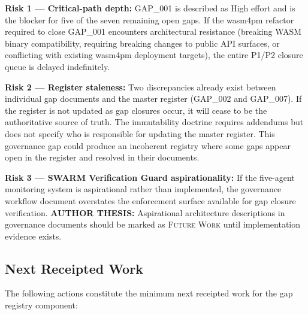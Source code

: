 \textbf{Risk 1 — Critical-path depth:} GAP\_001 is described as High effort and is
the blocker for five of the seven remaining open gaps. If the wasm4pm refactor required
to close GAP\_001 encounters architectural resistance (breaking WASM binary compatibility,
requiring breaking changes to public API surfaces, or conflicting with existing wasm4pm
deployment targets), the entire P1/P2 closure queue is delayed indefinitely.

\textbf{Risk 2 — Register staleness:} Two discrepancies already exist between individual
gap documents and the master register (GAP\_002 and GAP\_007). If the register is not
updated as gap closures occur, it will cease to be the authoritative source of truth.
The immutability doctrine requires addendums but does not specify who is responsible
for updating the master register. This governance gap could produce an incoherent
registry where some gaps appear open in the register and resolved in their documents.

\textbf{Risk 3 — SWARM Verification Guard aspirationality:} If the five-agent monitoring
system is aspirational rather than implemented, the governance workflow document
overstates the enforcement surface available for gap closure verification. \textbf{AUTHOR THESIS:}
Aspirational architecture descriptions in governance documents should be marked as
\textsc{Future Work} until implementation evidence exists.

\subsection{Next Receipted Work}
\label{sec:gaps-open-questions-next}

The following actions constitute the minimum next receipted work for the gap registry
component:

